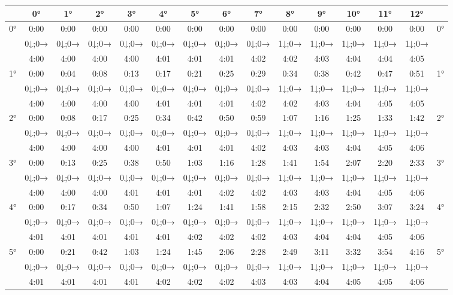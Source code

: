 \begin{scriptsize}\begin{tabular}{c || c | c | c | c | c | c | c | c | c | c | c | c | c || c}
		\space &0°&1°&2°&3°&4°&5°&6°&7°&8°&9°&10°&11°&12°\\\hline\hline
		\multirow{3}{*}{0°}&0:00&0:00&0:00&0:00&0:00&0:00&0:00&0:00&0:00&0:00&0:00&0:00&0:00&\multirow{3}{*}{0°}\\ \space&0↓;0→&0↓;0→&0↓;0→&0↓;0→&0↓;0→&0↓;0→&0↓;0→&0↓;0→&1↓;0→&1↓;0→&1↓;0→&1↓;0→&1↓;0→&\space\\&4:00&4:00&4:00&4:00&4:01&4:01&4:01&4:02&4:02&4:03&4:04&4:04&4:05&\space\\\hline
		\multirow{3}{*}{1°}&0:00&0:04&0:08&0:13&0:17&0:21&0:25&0:29&0:34&0:38&0:42&0:47&0:51&\multirow{3}{*}{1°}\\ \space&0↓;0→&0↓;0→&0↓;0→&0↓;0→&0↓;0→&0↓;0→&0↓;0→&0↓;0→&1↓;0→&1↓;0→&1↓;0→&1↓;0→&1↓;0→&\space\\&4:00&4:00&4:00&4:00&4:01&4:01&4:01&4:02&4:02&4:03&4:04&4:05&4:05&\space\\\hline
		\multirow{3}{*}{2°}&0:00&0:08&0:17&0:25&0:34&0:42&0:50&0:59&1:07&1:16&1:25&1:33&1:42&\multirow{3}{*}{2°}\\ \space&0↓;0→&0↓;0→&0↓;0→&0↓;0→&0↓;0→&0↓;0→&0↓;0→&0↓;0→&1↓;0→&1↓;0→&1↓;0→&1↓;0→&1↓;0→&\space\\&4:00&4:00&4:00&4:00&4:01&4:01&4:01&4:02&4:03&4:03&4:04&4:05&4:06&\space\\\hline
		\multirow{3}{*}{3°}&0:00&0:13&0:25&0:38&0:50&1:03&1:16&1:28&1:41&1:54&2:07&2:20&2:33&\multirow{3}{*}{3°}\\ \space&0↓;0→&0↓;0→&0↓;0→&0↓;0→&0↓;0→&0↓;0→&0↓;0→&0↓;0→&1↓;0→&1↓;0→&1↓;0→&1↓;0→&1↓;0→&\space\\&4:00&4:00&4:00&4:01&4:01&4:01&4:02&4:02&4:03&4:03&4:04&4:05&4:06&\space\\\hline
		\multirow{3}{*}{4°}&0:00&0:17&0:34&0:50&1:07&1:24&1:41&1:58&2:15&2:32&2:50&3:07&3:24&\multirow{3}{*}{4°}\\ \space&0↓;0→&0↓;0→&0↓;0→&0↓;0→&0↓;0→&0↓;0→&0↓;0→&0↓;0→&1↓;0→&1↓;0→&1↓;0→&1↓;0→&1↓;0→&\space\\&4:01&4:01&4:01&4:01&4:01&4:02&4:02&4:02&4:03&4:04&4:04&4:05&4:06&\space\\\hline
		\multirow{3}{*}{5°}&0:00&0:21&0:42&1:03&1:24&1:45&2:06&2:28&2:49&3:11&3:32&3:54&4:16&\multirow{3}{*}{5°}\\ \space&0↓;0→&0↓;0→&0↓;0→&0↓;0→&0↓;0→&0↓;0→&0↓;0→&0↓;0→&1↓;0→&1↓;0→&1↓;0→&1↓;0→&1↓;0→&\space\\&4:01&4:01&4:01&4:01&4:02&4:02&4:02&4:03&4:03&4:04&4:05&4:05&4:06&\space\\\hline

\end{tabular}
\end{scriptsize}
